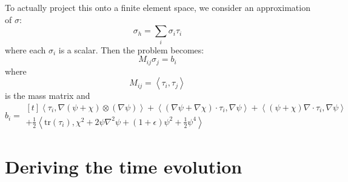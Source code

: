 \documentclass[reqno]{article}
\begin{document}
To actually project this onto a finite element space, we consider an approximation of $\sigma$:
\begin{equation}
    \sigma_h = \sum_i \sigma_i \tau_i
\end{equation}
where each $\sigma_i$ is a scalar.
Then the problem becomes:
\begin{equation}
    M_{ij} \sigma_j = b_i
\end{equation}
where
\begin{equation}
    M_{ij}
    =
    \left<\tau_i, \tau_j\right>
\end{equation}
is the mass matrix and
\begin{equation}
    b_i
    =
    \begin{multlined}[t]
        \left< \tau_i, \nabla \left( \psi + \chi \right) \otimes (\nabla \psi) \right>
        + \left< (\nabla \psi + \nabla \chi) \cdot  \tau_i, \nabla \psi \right>
        + \left< (\psi + \chi) \nabla \cdot \tau_i, \nabla \psi \right>\\
        + \tfrac12 \left< \text{tr}(\tau_i), \chi^2 + 2 \psi \nabla^2 \psi + (1 + \epsilon) \psi^2 + \tfrac12 \psi^4 \right>
    \end{multlined}
\end{equation}

\section{Deriving the time evolution}
\end{document}
